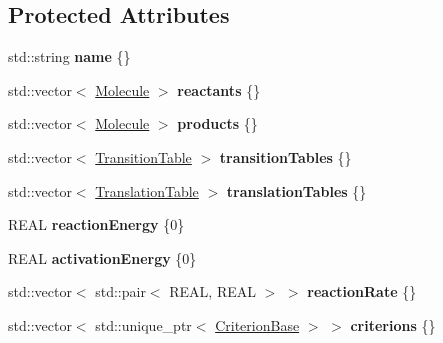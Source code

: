 \subsection*{Protected Attributes}
\begin{DoxyCompactItemize}
\item 
\mbox{\label{classReactionBase_a004e93dc692a166c7d9a7fc0fb2c7138}} 
std\+::string {\bfseries name} \{\}
\item 
\mbox{\label{classReactionBase_a550c52da47b04316b58bb0892df7c711}} 
std\+::vector$<$ \mbox{\hyperlink{classMolecule}{Molecule}} $>$ {\bfseries reactants} \{\}
\item 
\mbox{\label{classReactionBase_acd868f79a10adb1b0289fe5bfef6eba9}} 
std\+::vector$<$ \mbox{\hyperlink{classMolecule}{Molecule}} $>$ {\bfseries products} \{\}
\item 
\mbox{\label{classReactionBase_a6582ae367365272050cc1cd49b8be80d}} 
std\+::vector$<$ \mbox{\hyperlink{structTransitionTable}{Transition\+Table}} $>$ {\bfseries transition\+Tables} \{\}
\item 
\mbox{\label{classReactionBase_aad65650f91ccf99bfb28707144ac1c38}} 
std\+::vector$<$ \mbox{\hyperlink{structTranslationTable}{Translation\+Table}} $>$ {\bfseries translation\+Tables} \{\}
\item 
\mbox{\label{classReactionBase_ace96bb2e98f3d9ac620466122869086c}} 
R\+E\+AL {\bfseries reaction\+Energy} \{0\}
\item 
\mbox{\label{classReactionBase_a7d16d82ee2e553e6e71d4243c930f3ef}} 
R\+E\+AL {\bfseries activation\+Energy} \{0\}
\item 
\mbox{\label{classReactionBase_a43a1cf0faf80b3508bcb9c6ec8e7a3cd}} 
std\+::vector$<$ std\+::pair$<$ R\+E\+AL, R\+E\+AL $>$ $>$ {\bfseries reaction\+Rate} \{\}
\item 
\mbox{\label{classReactionBase_ac59e985477e007151293aa34a9eeb2d4}} 
std\+::vector$<$ std\+::unique\+\_\+ptr$<$ \mbox{\hyperlink{classCriterionBase}{Criterion\+Base}} $>$ $>$ {\bfseries criterions} \{\}
\end{DoxyCompactItemize}
